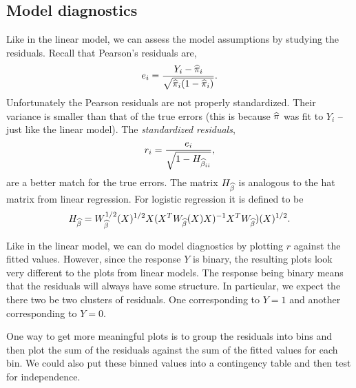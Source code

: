 \subsection{Model diagnostics}
Like in the linear  model, we can assess the model assumptions by studying the  residuals. Recall that Pearson's residuals are,
\[e_i = \frac{Y_i-\widehat{\pi}_i}{\sqrt{\widehat{\pi}_i(1-\widehat{\pi}_i)}}.\] 
Unfortunately the  Pearson  residuals  are  not  properly standardized.  Their  variance  is smaller  than  that of the  true  errors (this is because $\widehat{\pi}$  was fit to $Y_i$ --  just  like  the linear model). The \emph{standardized residuals},
\[ r_i = \frac{e_i}{\sqrt{1-H_{\widehat{\beta}_{ii}}}}, \]
are  a better   match  for the true errors. The  matrix $H_{\widehat{\beta}}$ is analogous to  the hat matrix from linear regression. For logistic regression it is defined to be
\[ H_{\widehat{\beta}}  =  W^{1/2}_{\widehat{\beta}}(X)^{1/2}X(X^TW_{\widehat{\beta}}(X)X)^{-1}X^TW_{\widehat{\beta}})(X)^{1/2}. \]

Like   in the linear model, we can do model diagnostics by plotting $r$ against the fitted values. However, since the response $Y$ is binary,  the resulting plots look very  different  to the  plots from linear models.  The response being  binary means that the  residuals will always have some structure. In particular, we expect the there two be two clusters of residuals. One corresponding to $Y=1$ and another corresponding to $Y=0$.

One way to get more meaningful plots is to group the residuals into bins and then plot the sum of the residuals  against the  sum  of the  fitted  values for each bin. We could also put  these  binned  values into a contingency  table   and then test  for  independence.

